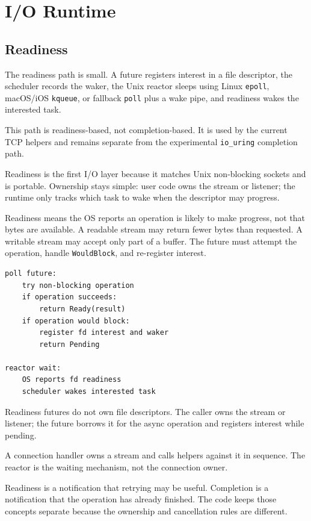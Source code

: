 \chapter{I/O Runtime}
\label{chap:io-runtime}

\section{Readiness}

The readiness path is small. A future registers interest in a file descriptor,
the scheduler records the waker, the Unix reactor sleeps using Linux
\texttt{epoll}, macOS/iOS \texttt{kqueue}, or fallback \texttt{poll} plus a
wake pipe, and readiness wakes the interested task.

This path is readiness-based, not completion-based. It is used by the current
TCP helpers and remains separate from the experimental \texttt{io\_uring}
completion path.

Readiness is the first I/O layer because it matches Unix non-blocking sockets
and is portable. Ownership stays simple: user code owns the stream or listener;
the runtime only tracks which task to wake when the descriptor may progress.

Readiness means the OS reports an operation is likely to make progress, not
that bytes are available. A readable stream may return fewer bytes than
requested. A writable stream may accept only part of a buffer. The future must
attempt the operation, handle \texttt{WouldBlock}, and re-register interest.

\begin{lstlisting}[language={},caption={Readiness future shape}]
poll future:
    try non-blocking operation
    if operation succeeds:
        return Ready(result)
    if operation would block:
        register fd interest and waker
        return Pending

reactor wait:
    OS reports fd readiness
    scheduler wakes interested task
\end{lstlisting}

Readiness futures do not own file descriptors. The caller owns the stream or
listener; the future borrows it for the async operation and registers interest
while pending.

A connection handler owns a stream and calls helpers against it in sequence.
The reactor is the waiting mechanism, not the connection owner.

\begin{notabene}
Readiness is a notification that retrying may be useful. Completion is a
notification that the operation has already finished. The code keeps those
concepts separate because the ownership and cancellation rules are different.
\end{notabene}

